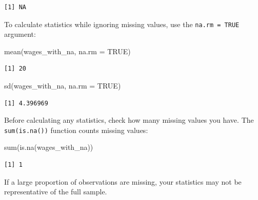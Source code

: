 \documentclass[
  letterpaper,
  DIV=11,
  numbers=noendperiod]{scrreprt}
\newenvironment{Shaded}{\begin{snugshade}}{\end{snugshade}}
\newcommand{\AttributeTok}[1]{\textcolor[rgb]{0.40,0.45,0.13}{#1}}
\newcommand{\ConstantTok}[1]{\textcolor[rgb]{0.56,0.35,0.01}{#1}}
\newcommand{\FunctionTok}[1]{\textcolor[rgb]{0.28,0.35,0.67}{#1}}
\newcommand{\NormalTok}[1]{\textcolor[rgb]{0.00,0.23,0.31}{#1}}
\begin{document}
\begin{verbatim}
[1] NA
\end{verbatim}

To calculate statistics while ignoring missing values, use the
\texttt{na.rm\ =\ TRUE} argument:

\begin{Shaded}
\begin{Highlighting}[]
\FunctionTok{mean}\NormalTok{(wages\_with\_na, }\AttributeTok{na.rm =} \ConstantTok{TRUE}\NormalTok{)}
\end{Highlighting}
\end{Shaded}

\begin{verbatim}
[1] 20
\end{verbatim}

\begin{Shaded}
\begin{Highlighting}[]
\FunctionTok{sd}\NormalTok{(wages\_with\_na, }\AttributeTok{na.rm =} \ConstantTok{TRUE}\NormalTok{)}
\end{Highlighting}
\end{Shaded}

\begin{verbatim}
[1] 4.396969
\end{verbatim}

\begin{tcolorbox}[enhanced jigsaw, arc=.35mm, bottomrule=.15mm, bottomtitle=1mm, breakable, colback=white, colbacktitle=quarto-callout-warning-color!10!white, colframe=quarto-callout-warning-color-frame, coltitle=black, left=2mm, leftrule=.75mm, opacityback=0, opacitybacktitle=0.6, rightrule=.15mm, title=\textcolor{quarto-callout-warning-color}{\faExclamationTriangle}\hspace{0.5em}{Always Check for Missing Data}, titlerule=0mm, toprule=.15mm, toptitle=1mm]

Before calculating any statistics, check how many missing values you
have. The \texttt{sum(is.na())} function counts missing values:

\begin{Shaded}
\begin{Highlighting}[]
\FunctionTok{sum}\NormalTok{(}\FunctionTok{is.na}\NormalTok{(wages\_with\_na))}
\end{Highlighting}
\end{Shaded}

\begin{verbatim}
[1] 1
\end{verbatim}

If a large proportion of observations are missing, your statistics may
not be representative of the full sample.

\end{tcolorbox}
\end{document}
